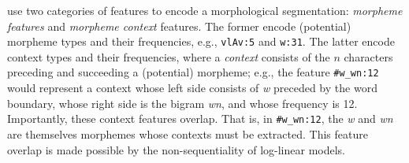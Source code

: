 \cite{poon-et-al:2009} use two categories of features to encode a morphological segmentation: \textit{morpheme features} and \textit{morpheme context} features.
The former encode (potential) morpheme types and their frequencies, e.g., \texttt{vlAv:5} and \texttt{w:31}. The 
latter encode context types and their frequencies, where a \emph{context} consists of the $n$ characters preceding and succeeding a (potential) morpheme;
e.g., the feature \texttt{\#w\_wn:12} would represent a context whose left side consists of \textit{w} preceded by the word boundary, whose right side is the bigram \textit{wn}, and whose frequency is 12. Importantly, these context features overlap. That is, in \texttt{\#w\_wn:12}, the \textit{w} and \textit{wn} are themselves morphemes whose contexts must be extracted.
This feature overlap is made possible by the non-sequentiality of log-linear models.

